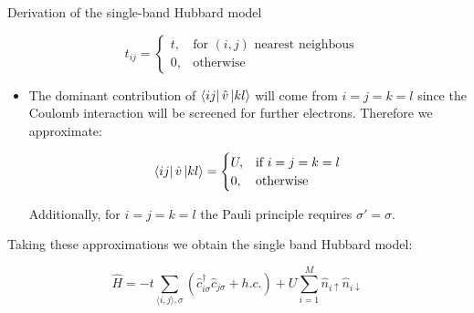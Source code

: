 \begin{section}{Derivation of the single-band Hubbard model}
\begin{itemize}
\begin{equation}
t_{ij} = \begin{cases}
             t,  & \text{for } (i,j) \text{ nearest neighbous} \\
             0,  & \text{otherwise}
       \end{cases} \quad
\end{equation}

\item The dominant contribution of $\bra{ij} \hat{v} \ket{kl}$ will come from $i=j=k=l$ since the Coulomb interaction will be screened for further electrons. Therefore we approximate:

\begin{equation}
\bra{ij} \hat{v} \ket{kl} =
	\begin{cases}
		U, & \text{if } i=j=k=l \\
		0, & \text{otherwise}
	\end{cases}						
\end{equation}

Additionally, for $i=j=k=l$ the Pauli principle requires $\sigma' = \sigma$.

\end{itemize}

Taking these approximations we obtain the single band Hubbard model:

\begin{equation}
\hat{H} = -t\sum_{\langle i,j \rangle, \sigma}(\hat{c}_{i \sigma}^\dagger \hat{c}_{j \sigma} + h.c.) + U \sum_{i=1}^M \hat{n}_{i\uparrow}\hat{n}_{i\downarrow}
\end{equation}

\end{section}


